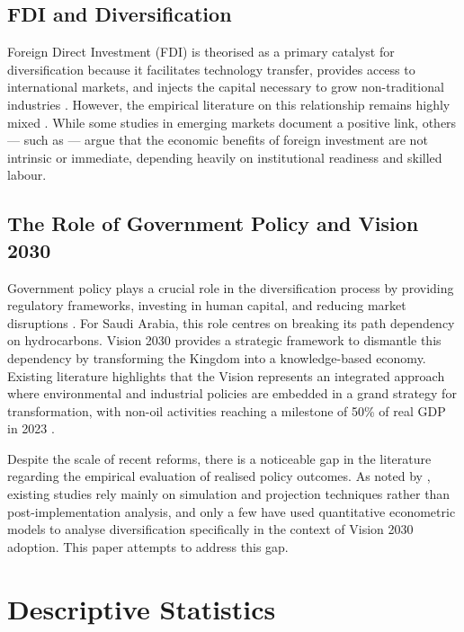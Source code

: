 \documentclass[12pt, a4paper]{article}
\begin{document}
\subsection{FDI and Diversification}

Foreign Direct Investment (FDI) is theorised as a primary catalyst for diversification because it facilitates technology transfer, provides access to international markets, and injects the capital necessary to grow non-traditional industries \citep{alroubaie2025}. However, the empirical literature on this relationship remains highly mixed \citep{sallam2026}. While some studies in emerging markets document a positive link, others --- such as \citet{sadorsky2012} --- argue that the economic benefits of foreign investment are not intrinsic or immediate, depending heavily on institutional readiness and skilled labour.

\subsection{The Role of Government Policy and Vision 2030}

Government policy plays a crucial role in the diversification process by providing regulatory frameworks, investing in human capital, and reducing market disruptions \citep{alroubaie2025}. For Saudi Arabia, this role centres on breaking its path dependency on hydrocarbons. Vision 2030 provides a strategic framework to dismantle this dependency by transforming the Kingdom into a knowledge-based economy. Existing literature highlights that the Vision represents an integrated approach where environmental and industrial policies are embedded in a grand strategy for transformation, with non-oil activities reaching a milestone of 50\% of real GDP in 2023 \citep{sallam2026}.

Despite the scale of recent reforms, there is a noticeable gap in the literature regarding the empirical evaluation of realised policy outcomes. As noted by \citet{sallam2026}, existing studies rely mainly on simulation and projection techniques rather than post-implementation analysis, and only a few have used quantitative econometric models to analyse diversification specifically in the context of Vision 2030 adoption. This paper attempts to address this gap.

\section{Descriptive Statistics}
\end{document}
